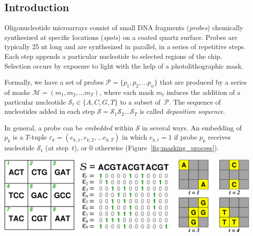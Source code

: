 \documentclass[portrait]{a0poster}
\newcommand{\ds}{\mathcal{S}}
\begin{document}
\sffamily				%
\large					%
\setlength{\columnsep}{96pt}		%
\setlength{\columnseprule}{1pt}		%
\setlength{\multicolsep}{96pt}		%

\begin{multicols}{3}[\aggiheader]


\setlength{\parskip}{5mm}

\section*{\textcolor{aggigreen}{Introduction}}

\noindent Oligonucleotide microarrays consist of small DNA fragments
(\emph{probes}) chemically synthesized at specific locations (\emph{spots}) on
a coated quartz surface. Probes are typically 25 nt long and are synthesized
in parallel, in a series of repetitive steps. Each step appends a particular
nucleotide to selected regions of the chip. Selection occurs by exposure to
light with the help of a photolithographic mask.

\noindent Formally, we have a set of probes
$\mathcal{P} = \{p_{1}, p_{2}, ... p_{n}\}$ that are produced by a series of
masks $\mathcal{M} = (m_{1}, m_{2}, ... m_T)$, where each mask $m_{t}$ induces
the addition of a particular nucleotide $\ds_{t} \in \{A, C, G, T\}$ to a subset
of~$\mathcal{P}$. The sequence of nucleotides added in each step
$\ds = \ds_{1} \ds_{2} \ldots \ds_{T}$ is called \emph{deposition sequence}.

\noindent In general, a probe can be \emph{embedded} within $\mathcal{S}$ in
several ways. An embedding of $p_k$ is a $T$-tuple
$\varepsilon_{k} = (e_{k,1}, e_{k,2}, ... e_{k,T})$ in which $e_{k,t} = 1$ if
probe $p_{k}$ receives nucleotide $\ds_t$ (at step~$t$), or 0 otherwise
(Figure~\ref{fig:masking_process}).

\begin{myfigure}
\vspace*{4ex}
\centerline{\includegraphics[width=700pt]{chip}}
\caption{Synthesis of a hypothetical 3$\times$3 chip. Left: chip
layout and the 3~nt probe sequences. Center: deposition
sequence and probe embeddings. Right: first four resulting masks.}
\label{fig:masking_process}
\vspace*{4ex}
\end{myfigure}


\end{multicols}
\end{document}
